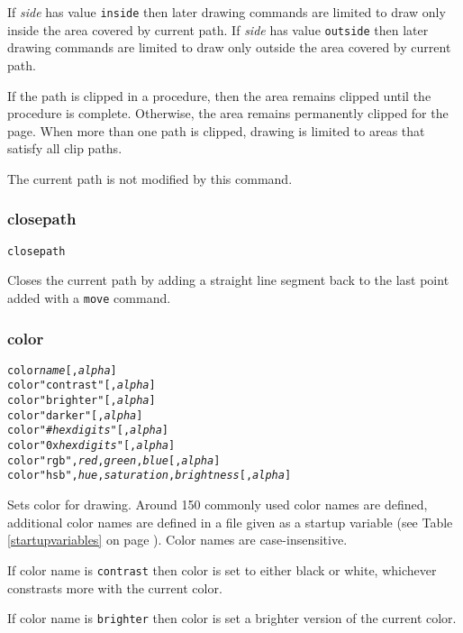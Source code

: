 If \textit{side} has value \texttt{inside} then
later drawing commands are limited to draw only inside the area
covered by current path.
If \textit{side} has value \texttt{outside} then
later drawing commands are limited to draw only outside the area
covered by current path.

If the path is clipped in a procedure, then the area remains
clipped until the procedure is complete.  Otherwise, the area
remains permanently clipped for the page.
When more than one path is clipped, drawing is limited to
areas that satisfy all clip paths.

The current path is not modified by this command.

\subsubsection{closepath}

\begin{alltt}
closepath
\end{alltt}

Closes the current path by adding a straight line segment
back to the last point added with a \texttt{move} command.

\subsubsection{color}

\begin{alltt}
color \textit{name} [, \textit{alpha}]
color "contrast" [, \textit{alpha}]
color "brighter" [, \textit{alpha}]
color "darker" [, \textit{alpha}]
color "\#\textit{hexdigits}" [, \textit{alpha}]
color "0x\textit{hexdigits}" [, \textit{alpha}]
color "rgb", \textit{red}, \textit{green}, \textit{blue} [, \textit{alpha}]
color "hsb", \textit{hue}, \textit{saturation}, \textit{brightness} [, \textit{alpha}]
\end{alltt}

Sets color for drawing.  Around 150 commonly used color names are defined,
additional color names are defined in a file given as a startup variable (see
Table \ref{startupvariables} on page \pageref{startupvariables}).
Color names are case-insensitive.

If color name is \texttt{contrast} then color is set to either black or white,
whichever constrasts more with the current color.

If color name is \texttt{brighter} then color is set a brighter
version of the current color.


